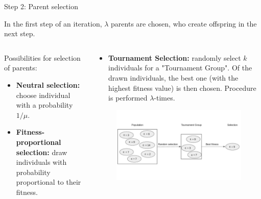 \begin{frame}{Step 2: Parent selection}


In the first step of an iteration, $\lambda$ parents are chosen, who create offspring in the next step.


\begin{columns}
\begin{column}{0.5\textwidth}

  Possibilities for selection of parents:

  \begin{itemize}
    \item \textbf{Neutral selection: }choose individual with a probability $1/\mu$.
    \item \textbf{Fitness-proportional selection: }draw individuals with probability proportional to their fitness.
  \end{itemize}
\end{column}%
\begin{column}{0.5\textwidth}
  \begin{itemize}
    \item \textbf{Tournament Selection: }randomly select $k$ individuals for a "Tournament Group". Of the drawn individuals, the best one (with the highest fitness value) is then chosen. Procedure is performed $\lambda$-times.
  \end{itemize}

  \begin{figure}
    \includegraphics[width = 0.9\linewidth]{images/tournament_selection_c.pdf}
  \end{figure}

\end{column}
\end{columns}

\end{frame}

